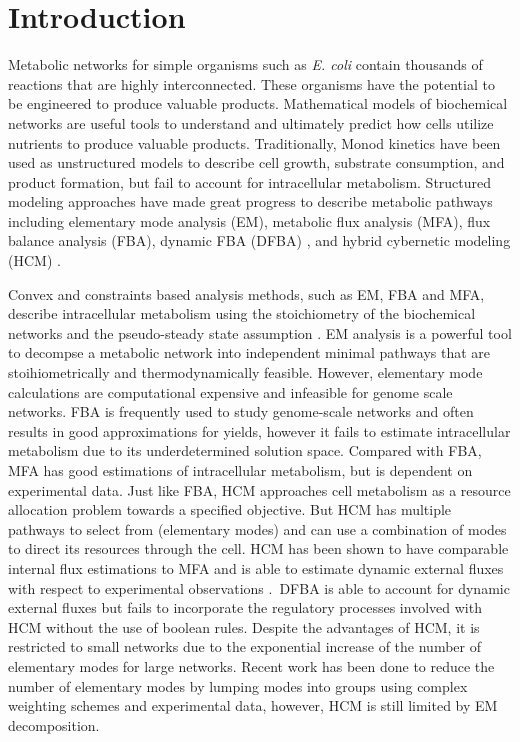 \documentclass[10pt,twocolumn,twoside,final]{IEEEtran}
\begin{document}
\section{Introduction}
Metabolic networks for simple organisms such as \textit{E. coli} contain thousands of reactions that are highly interconnected.
These organisms have the potential to be engineered to produce valuable products.
Mathematical models of biochemical networks are useful tools to understand and ultimately predict how cells utilize nutrients to produce valuable products.
Traditionally, Monod kinetics have been used as unstructured models to describe cell growth, substrate consumption, and product formation, but fail to account for intracellular metabolism\cite{shuler_book}.
Structured modeling approaches have made great progress to describe metabolic pathways including elementary mode analysis (EM)\cite{2006_vonKamp_Metatool}, metabolic flux analysis (MFA), flux balance analysis (FBA)\cite{2010_orth_NatBiotech}, dynamic FBA (DFBA) \cite{1994_varma_palsson_ApplEnvMicro,2002_Mahadevan_BiophysJ}, and hybrid cybernetic modeling (HCM) \cite{2008_kim_varner_ramkrishna_BiotechProg}.

Convex and constraints based analysis methods, such as EM, FBA and MFA,
describe intracellular metabolism using the stoichiometry of the biochemical networks and the pseudo-steady state assumption \cite{2010_orth_NatBiotech}.
EM analysis is a powerful tool to decompse a metabolic network into independent minimal pathways that are stoihiometrically and thermodynamically feasible.
However, elementary mode calculations are computational expensive and infeasible for genome scale networks\cite{2004_lee_varner_ko_ieee}.
FBA is frequently used to study genome-scale networks\cite{2010_orth_NatBiotech} and often results in good approximations for yields, however it fails to estimate intracellular metabolism due to its underdetermined solution space.
Compared with FBA, MFA has good estimations of intracellular metabolism, but is dependent on experimental data.
Just like FBA, HCM approaches cell metabolism as a resource allocation problem towards a specified objective. 
But HCM has multiple pathways to select from (elementary modes) and can use a combination of modes to direct its resources through the cell.
HCM has been shown to have comparable internal flux estimations to MFA and is able to estimate dynamic external fluxes with respect to experimental observations \cite{2008_kim_varner_ramkrishna_BiotechProg}.\
DFBA is able to account for dynamic external fluxes but fails to incorporate the regulatory processes involved with HCM without the use of boolean rules\cite{2001_covert_schilling_palsson}.
Despite the advantages of HCM, it is restricted to small networks due to the exponential increase of the number of elementary modes for large networks.
Recent work has been done to reduce the number of elementary modes by lumping modes into groups using complex weighting schemes and experimental data\cite{2010_song_ramkrishna}, however, HCM is still limited by EM decomposition.
\end{document}
